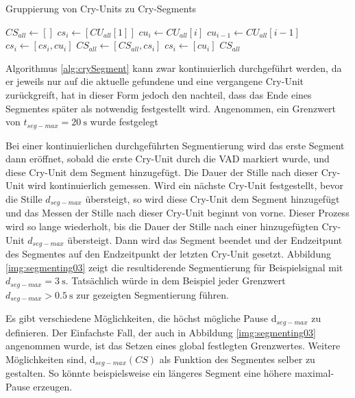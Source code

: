 \begin{algorithm}[H]
	\caption{Gruppierung von Cry-Units zu Cry-Segments}
	\label{alg:crySegment}
	\begin{algorithmic}[1]
		\State $ CS_{all} \gets []$
		\State $ cs_i \gets [CU_{all}[1]]$
		\State $ cu_i \gets CU_{all}[i]$
		\State $cu_{i-1} \gets CU_{all}[i-1]$
		\State $cs_i \gets [cs_i , cu_i]$
		\Else
		\State $CS_{all} \gets [CS_{all}, cs_i]$
		\State $cs_i \gets [cu_i]$
		\EndIf
		\EndFor
		\Return $CS_{all}$
		
		\EndFunction
		
	\end{algorithmic}
\end{algorithm}

Algorithmus  \ref{alg:crySegment} kann zwar kontinuierlich durchgeführt werden, da er jeweils nur auf die aktuelle gefundene und eine vergangene Cry-Unit zurückgreift, hat in dieser Form jedoch den nachteil, dass das Ende eines Segmentes später als notwendig festgestellt wird. Angenommen, ein Grenzwert von $t_{seg-max} = \SI{20}{\second}$ wurde festgelegt


Bei einer kontinuierlichen durchgeführten Segmentierung wird das erste Segment dann eröffnet, sobald die erste Cry-Unit durch die VAD markiert wurde, und diese Cry-Unit dem Segment hinzugefügt. Die Dauer der Stille nach dieser Cry-Unit wird kontinuierlich gemessen. Wird ein nächste Cry-Unit festgestellt, bevor die Stille $d_{seg-max}$ übersteigt, so wird diese Cry-Unit dem Segment hinzugefügt und das Messen der Stille nach dieser Cry-Unit beginnt von vorne. Dieser Prozess wird so lange wiederholt, bis die Dauer der Stille nach einer hinzugefügten Cry-Unit $d_{seg-max}$ übersteigt. Dann wird das Segment beendet und der Endzeitpunt des Segmentes auf den Endzeitpunkt der letzten Cry-Unit gesetzt. Abbildung \ref{img:segmenting03} zeigt die resultiderende Segmentierung für Beispielsignal mit $d_{seg-max}  = \SI{3}{\second}$. Tatsächlich würde in dem Beispiel jeder Grenzwert $d_{seg-max} >\SI{0.5}{\second}$ zur gezeigten Segmentierung führen.

Es gibt verschiedene Möglichkeiten, die höchst mögliche Pause d$_{seg-max}$ zu definieren. Der Einfachste Fall, der auch in Abbildung \ref{img:segmenting03} angenommen wurde, ist das Setzen eines global festlegten Grenzwertes. Weitere Möglichkeiten sind, d$_{seg-max}(CS)$ als Funktion des Segmentes selber zu gestalten. So könnte beispielsweise ein längeres Segment eine höhere maximal-Pause erzeugen. 

